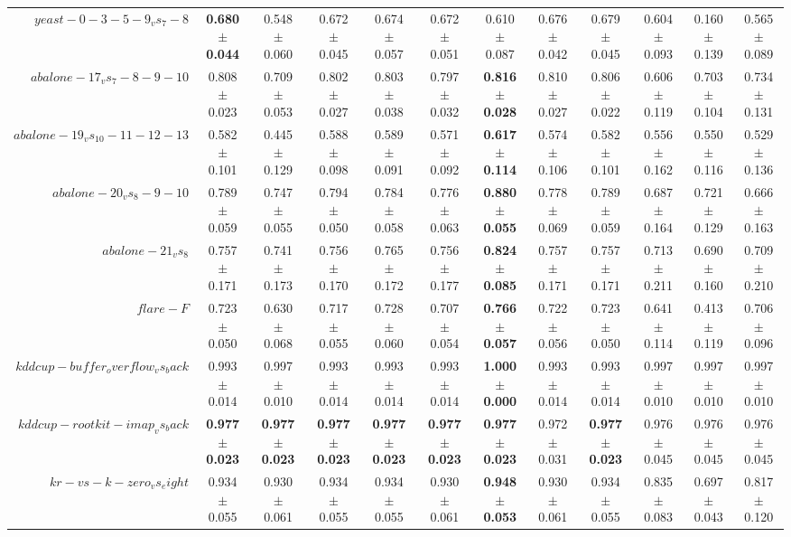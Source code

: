 \begin{table}[!ht]
{\begin{tabular}{r c c c c c c c c c c c}
$yeast-0-3-5-9_vs_7-8$ & \textbf{0.680 $\pm$ 0.044} & 0.548 $\pm$ 0.060 & 0.672 $\pm$ 0.045 & 0.674 $\pm$ 0.057 & 0.672 $\pm$ 0.051 & 0.610 $\pm$ 0.087 & 0.676 $\pm$ 0.042 & 0.679 $\pm$ 0.045 & 0.604 $\pm$ 0.093 & 0.160 $\pm$ 0.139 & 0.565 $\pm$ 0.089 \\
$abalone-17_vs_7-8-9-10$ & 0.808 $\pm$ 0.023 & 0.709 $\pm$ 0.053 & 0.802 $\pm$ 0.027 & 0.803 $\pm$ 0.038 & 0.797 $\pm$ 0.032 & \textbf{0.816 $\pm$ 0.028} & 0.810 $\pm$ 0.027 & 0.806 $\pm$ 0.022 & 0.606 $\pm$ 0.119 & 0.703 $\pm$ 0.104 & 0.734 $\pm$ 0.131 \\
$abalone-19_vs_10-11-12-13$ & 0.582 $\pm$ 0.101 & 0.445 $\pm$ 0.129 & 0.588 $\pm$ 0.098 & 0.589 $\pm$ 0.091 & 0.571 $\pm$ 0.092 & \textbf{0.617 $\pm$ 0.114} & 0.574 $\pm$ 0.106 & 0.582 $\pm$ 0.101 & 0.556 $\pm$ 0.162 & 0.550 $\pm$ 0.116 & 0.529 $\pm$ 0.136 \\
$abalone-20_vs_8-9-10$ & 0.789 $\pm$ 0.059 & 0.747 $\pm$ 0.055 & 0.794 $\pm$ 0.050 & 0.784 $\pm$ 0.058 & 0.776 $\pm$ 0.063 & \textbf{0.880 $\pm$ 0.055} & 0.778 $\pm$ 0.069 & 0.789 $\pm$ 0.059 & 0.687 $\pm$ 0.164 & 0.721 $\pm$ 0.129 & 0.666 $\pm$ 0.163 \\
$abalone-21_vs_8$ & 0.757 $\pm$ 0.171 & 0.741 $\pm$ 0.173 & 0.756 $\pm$ 0.170 & 0.765 $\pm$ 0.172 & 0.756 $\pm$ 0.177 & \textbf{0.824 $\pm$ 0.085} & 0.757 $\pm$ 0.171 & 0.757 $\pm$ 0.171 & 0.713 $\pm$ 0.211 & 0.690 $\pm$ 0.160 & 0.709 $\pm$ 0.210 \\
$flare-F$ & 0.723 $\pm$ 0.050 & 0.630 $\pm$ 0.068 & 0.717 $\pm$ 0.055 & 0.728 $\pm$ 0.060 & 0.707 $\pm$ 0.054 & \textbf{0.766 $\pm$ 0.057} & 0.722 $\pm$ 0.056 & 0.723 $\pm$ 0.050 & 0.641 $\pm$ 0.114 & 0.413 $\pm$ 0.119 & 0.706 $\pm$ 0.096 \\
$kddcup-buffer_overflow_vs_back$ & 0.993 $\pm$ 0.014 & 0.997 $\pm$ 0.010 & 0.993 $\pm$ 0.014 & 0.993 $\pm$ 0.014 & 0.993 $\pm$ 0.014 & \textbf{1.000 $\pm$ 0.000} & 0.993 $\pm$ 0.014 & 0.993 $\pm$ 0.014 & 0.997 $\pm$ 0.010 & 0.997 $\pm$ 0.010 & 0.997 $\pm$ 0.010 \\
$kddcup-rootkit-imap_vs_back$ & \textbf{0.977 $\pm$ 0.023} & \textbf{0.977 $\pm$ 0.023} & \textbf{0.977 $\pm$ 0.023} & \textbf{0.977 $\pm$ 0.023} & \textbf{0.977 $\pm$ 0.023} & \textbf{0.977 $\pm$ 0.023} & 0.972 $\pm$ 0.031 & \textbf{0.977 $\pm$ 0.023} & 0.976 $\pm$ 0.045 & 0.976 $\pm$ 0.045 & 0.976 $\pm$ 0.045 \\
$kr-vs-k-zero_vs_eight$ & 0.934 $\pm$ 0.055 & 0.930 $\pm$ 0.061 & 0.934 $\pm$ 0.055 & 0.934 $\pm$ 0.055 & 0.930 $\pm$ 0.061 & \textbf{0.948 $\pm$ 0.053} & 0.930 $\pm$ 0.061 & 0.934 $\pm$ 0.055 & 0.835 $\pm$ 0.083 & 0.697 $\pm$ 0.043 & 0.817 $\pm$ 0.120 \\

\end{tabular}}
\end{table}
